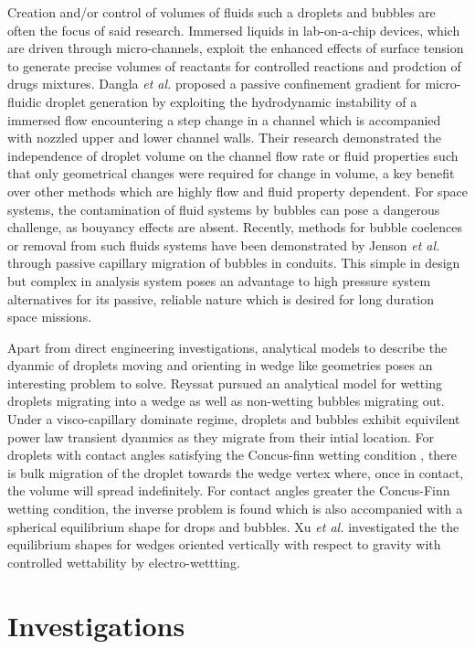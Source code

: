 \documentclass{article}
\begin{document}
Creation and/or control of volumes of fluids such a droplets and bubbles are often the focus of said research. Immersed liquids in lab-on-a-chip devices, which are driven through micro-channels, exploit the enhanced effects of surface tension to generate precise volumes of reactants for controlled reactions and prodction of drugs mixtures. Dangla \textit{et al.} \cite{Dangla2013} proposed a passive confinement gradient for micro-fluidic droplet generation by exploiting the hydrodynamic instability of a immersed flow encountering a step change in a channel which is accompanied with nozzled upper and lower channel walls. Their research demonstrated the independence of droplet volume on the channel flow rate or fluid properties such that only geometrical changes were required for change in volume, a key benefit over other methods which are highly flow and fluid property dependent. For space systems, the contamination of fluid systems by bubbles can pose a dangerous challenge, as bouyancy effects are absent. Recently, methods for bubble coelences or removal from such fluids systems have been demonstrated by Jenson \textit{et al.} \cite{Jenson2014} through passive capillary migration of bubbles in conduits. This simple in design but complex in analysis system poses an advantage to high pressure system alternatives for its passive, reliable nature which is desired for long duration space missions. 

Apart from direct engineering investigations, analytical models to describe the dyanmic of droplets moving and orienting in wedge like geometries poses an interesting problem to solve. Reyssat \cite{Reyssat2014} pursued an analytical model for wetting droplets migrating into a wedge as well as non-wetting bubbles migrating out. Under a visco-capillary dominate regime, droplets and bubbles exhibit equivilent power law transient dyanmics as they migrate from their intial location. For droplets with contact angles satisfying the Concus-finn wetting condition \cite{Concus1998}, there is bulk migration of the droplet towards the wedge vertex where, once in contact, the volume will spread indefinitely. For contact angles greater the Concus-Finn wetting condition, the inverse problem is found which is also accompanied with a spherical equilibrium shape for drops and bubbles. Xu \textit{et al.} \cite{Xu2016} investigated the the equilibrium shapes for wedges oriented vertically with respect to gravity with controlled wettability by electro-wettting. 
   

\section*{Investigations}
\end{document}

